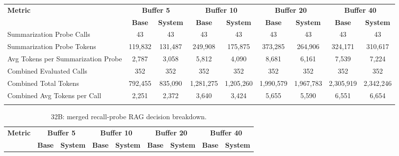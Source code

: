 \documentclass[pdflatex,sn-mathphys-num]{sn-jnl}%
\theoremstyle{thmstyleone}%
\theoremstyle{thmstyletwo}%
\theoremstyle{thmstylethree}%
\begin{document}
\begin{appendices}
\begin{landscape}
\begin{longtable}{@{}p{3.8cm}cccccccc@{}}
\toprule
\textbf{Metric} & \multicolumn{2}{c}{\textbf{Buffer 5}} & \multicolumn{2}{c}{\textbf{Buffer 10}} & \multicolumn{2}{c}{\textbf{Buffer 20}} & \multicolumn{2}{c}{\textbf{Buffer 40}} \\
\cmidrule(lr){2-3}\cmidrule(lr){4-5}\cmidrule(lr){6-7}\cmidrule(lr){8-9}
 & \textbf{Base} & \textbf{System} & \textbf{Base} & \textbf{System} & \textbf{Base} & \textbf{System} & \textbf{Base} & \textbf{System} \\
\midrule
\endhead
Summarization Probe Calls & 43 & 43 & 43 & 43 & 43 & 43 & 43 & 43 \\
Summarization Probe Tokens & 119,832 & 131,487 & 249,908 & 175,875 & 373,285 & 264,906 & 324,171 & 310,617 \\
Avg Tokens per Summarization Probe & 2,787 & 3,058 & 5,812 & 4,090 & 8,681 & 6,161 & 7,539 & 7,224 \\
Combined Evaluated Calls & 352 & 352 & 352 & 352 & 352 & 352 & 352 & 352 \\
Combined Total Tokens & 792,455 & 835,090 & 1,281,275 & 1,205,260 & 1,990,579 & 1,967,783 & 2,305,919 & 2,342,246 \\
Combined Avg Tokens per Call & 2,251 & 2,372 & 3,640 & 3,424 & 5,655 & 5,590 & 6,551 & 6,654 \\
\botrule
\end{longtable}
\normalsize
\end{landscape}
\begin{landscape}
\tiny
\begin{longtable}{@{}p{3.8cm}cccccccc@{}}
\caption{32B: merged recall-probe RAG decision breakdown.}\label{tab:app_32b_rag_probe}\\

\toprule
\textbf{Metric} & \multicolumn{2}{c}{\textbf{Buffer 5}} & \multicolumn{2}{c}{\textbf{Buffer 10}} & \multicolumn{2}{c}{\textbf{Buffer 20}} & \multicolumn{2}{c}{\textbf{Buffer 40}} \\
\cmidrule(lr){2-3}\cmidrule(lr){4-5}\cmidrule(lr){6-7}\cmidrule(lr){8-9}
 & \textbf{Base} & \textbf{System} & \textbf{Base} & \textbf{System} & \textbf{Base} & \textbf{System} & \textbf{Base} & \textbf{System} \\
\midrule
\endfirsthead


\end{longtable}
\end{landscape}
\end{appendices}
\end{document}
